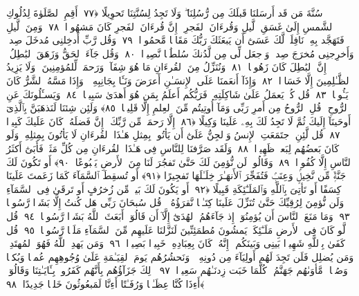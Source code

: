  سُنَّةَ مَن قَد أَرسَلنَا قَبلَكَ مِن رُّسُلِنَا ۖ وَلَا تَجِدُ لِسُنَّتِنَا تَحوِيلًا ﴿٧٧﴾
 أَقِمِ ٱلصَّلَوٰةَ لِدُلُوكِ ٱلشَّمسِ إِلَىٰ غَسَقِ ٱلَّيلِ وَقُرءَانَ ٱلفَجرِ ۖ إِنَّ قُرءَانَ ٱلفَجرِ كَانَ مَشهُودًۭا ﴿٧٨﴾
 وَمِنَ ٱلَّيلِ فَتَهَجَّد بِهِۦ نَافِلَةًۭ لَّكَ عَسَىٰٓ أَن يَبعَثَكَ رَبُّكَ مَقَامًۭا مَّحمُودًۭا ﴿٧٩﴾
 وَقُل رَّبِّ أَدخِلنِى مُدخَلَ صِدقٍۢ وَأَخرِجنِى مُخرَجَ صِدقٍۢ وَٱجعَل لِّى مِن لَّدُنكَ سُلطَٰنًۭا نَّصِيرًۭا ﴿٨٠﴾
 وَقُل جَآءَ ٱلحَقُّ وَزَهَقَ ٱلبَٰطِلُ ۚ إِنَّ ٱلبَٰطِلَ كَانَ زَهُوقًۭا ﴿٨١﴾
 وَنُنَزِّلُ مِنَ ٱلقُرءَانِ مَا هُوَ شِفَآءٌۭ وَرَحمَةٌۭ لِّلمُؤمِنِينَ ۙ وَلَا يَزِيدُ ٱلظَّـٰلِمِينَ إِلَّا خَسَارًۭا ﴿٨٢﴾
 وَإِذَآ أَنعَمنَا عَلَى ٱلإِنسَـٰنِ أَعرَضَ وَنَـَٔا بِجَانِبِهِۦ ۖ وَإِذَا مَسَّهُ ٱلشَّرُّ كَانَ يَـُٔوسًۭا ﴿٨٣﴾
 قُل كُلٌّۭ يَعمَلُ عَلَىٰ شَاكِلَتِهِۦ فَرَبُّكُم أَعلَمُ بِمَن هُوَ أَهدَىٰ سَبِيلًۭا ﴿٨٤﴾
 وَيَسـَٔلُونَكَ عَنِ ٱلرُّوحِ ۖ قُلِ ٱلرُّوحُ مِن أَمرِ رَبِّى وَمَآ أُوتِيتُم مِّنَ ٱلعِلمِ إِلَّا قَلِيلًۭا ﴿٨٥﴾
 وَلَئِن شِئنَا لَنَذهَبَنَّ بِٱلَّذِىٓ أَوحَينَآ إِلَيكَ ثُمَّ لَا تَجِدُ لَكَ بِهِۦ عَلَينَا وَكِيلًا ﴿٨٦﴾
 إِلَّا رَحمَةًۭ مِّن رَّبِّكَ ۚ إِنَّ فَضلَهُۥ كَانَ عَلَيكَ كَبِيرًۭا ﴿٨٧﴾
 قُل لَّئِنِ ٱجتَمَعَتِ ٱلإِنسُ وَٱلجِنُّ عَلَىٰٓ أَن يَأتُوا۟ بِمِثلِ هَـٰذَا ٱلقُرءَانِ لَا يَأتُونَ بِمِثلِهِۦ وَلَو كَانَ بَعضُهُم لِبَعضٍۢ ظَهِيرًۭا ﴿٨٨﴾
 وَلَقَد صَرَّفنَا لِلنَّاسِ فِى هَـٰذَا ٱلقُرءَانِ مِن كُلِّ مَثَلٍۢ فَأَبَىٰٓ أَكثَرُ ٱلنَّاسِ إِلَّا كُفُورًۭا ﴿٨٩﴾
 وَقَالُوا۟ لَن نُّؤمِنَ لَكَ حَتَّىٰ تَفجُرَ لَنَا مِنَ ٱلأَرضِ يَنۢبُوعًا ﴿٩٠﴾
 أَو تَكُونَ لَكَ جَنَّةٌۭ مِّن نَّخِيلٍۢ وَعِنَبٍۢ فَتُفَجِّرَ ٱلأَنهَـٰرَ خِلَـٰلَهَا تَفجِيرًا ﴿٩١﴾
 أَو تُسقِطَ ٱلسَّمَآءَ كَمَا زَعَمتَ عَلَينَا كِسَفًا أَو تَأتِىَ بِٱللَّهِ وَٱلمَلَـٰٓئِكَةِ قَبِيلًا ﴿٩٢﴾
 أَو يَكُونَ لَكَ بَيتٌۭ مِّن زُخرُفٍ أَو تَرقَىٰ فِى ٱلسَّمَآءِ وَلَن نُّؤمِنَ لِرُقِيِّكَ حَتَّىٰ تُنَزِّلَ عَلَينَا كِتَـٰبًۭا نَّقرَؤُهُۥ ۗ قُل سُبحَانَ رَبِّى هَل كُنتُ إِلَّا بَشَرًۭا رَّسُولًۭا ﴿٩٣﴾
 وَمَا مَنَعَ ٱلنَّاسَ أَن يُؤمِنُوٓا۟ إِذ جَآءَهُمُ ٱلهُدَىٰٓ إِلَّآ أَن قَالُوٓا۟ أَبَعَثَ ٱللَّهُ بَشَرًۭا رَّسُولًۭا ﴿٩٤﴾
 قُل لَّو كَانَ فِى ٱلأَرضِ مَلَـٰٓئِكَةٌۭ يَمشُونَ مُطمَئِنِّينَ لَنَزَّلنَا عَلَيهِم مِّنَ ٱلسَّمَآءِ مَلَكًۭا رَّسُولًۭا ﴿٩٥﴾
 قُل كَفَىٰ بِٱللَّهِ شَهِيدًۢا بَينِى وَبَينَكُم ۚ إِنَّهُۥ كَانَ بِعِبَادِهِۦ خَبِيرًۢا بَصِيرًۭا ﴿٩٦﴾
 وَمَن يَهدِ ٱللَّهُ فَهُوَ ٱلمُهتَدِ ۖ وَمَن يُضلِل فَلَن تَجِدَ لَهُم أَولِيَآءَ مِن دُونِهِۦ ۖ وَنَحشُرُهُم يَومَ ٱلقِيَـٰمَةِ عَلَىٰ وُجُوهِهِم عُميًۭا وَبُكمًۭا وَصُمًّۭا ۖ مَّأوَىٰهُم جَهَنَّمُ ۖ كُلَّمَا خَبَت زِدنَـٰهُم سَعِيرًۭا ﴿٩٧﴾
 ذَٟلِكَ جَزَآؤُهُم بِأَنَّهُم كَفَرُوا۟ بِـَٔايَـٰتِنَا وَقَالُوٓا۟ أَءِذَا كُنَّا عِظَـٰمًۭا وَرُفَـٰتًا أَءِنَّا لَمَبعُوثُونَ خَلقًۭا جَدِيدًا ﴿٩٨﴾
